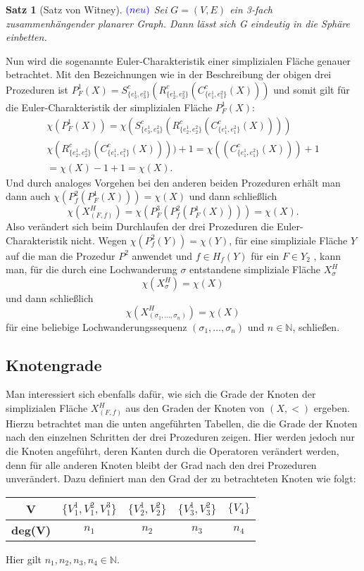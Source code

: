 \documentclass[12pt,titlepage]{article}
\newtheorem{satz}{Satz}[section]
\begin{document}
\begin{satz}[Satz von Witney]$\textcolor{blue}{(neu)}$
Sei $G=(V,E)$ ein 3-fach zusammenhängender planarer Graph. Dann lässt sich G eindeutig in die Sphäre einbetten.
\end{satz}
Nun wird die sogenannte Euler-Charakteristik einer simplizialen Fläche genauer betrachtet.
Mit den Bezeichnungen wie in der Beschreibung der obigen drei Prozeduren ist $P_F^1(X)=S^c_{\{e_3^1,e_3^2\}}(R^c_{\{e_2^1,e_2^2\}}(C^c_{\{ e_1^1,e_1^2\} }(X)))$ und somit gilt für die Euler-Charakteristik der simplizialen Fläche $P^1_F(X):$ 
\begin{gather*}
\chi (P^1_F(X))=\chi(S^c_{\{e_3^1,e_3^2\}}(R^c_{\{e_2^1,e_2^2\}}(C^c_{\{ e_1^1,e_1^2\} }(X))))\\
\chi(R^c_{\{e_2^1,e_2^2\}}(C^c_{\{ e_1^1,e_1^2\} }(X))))+1=\chi((C^c_{\{ e_1^1,e_1^2\} }(X)))+1\\
=\chi(X)-1+1=\chi(X).
\end{gather*}
Und durch analoges Vorgehen bei den anderen beiden Prozeduren erhält man dann auch $\chi(P_f^2(P_F^1(X)))=\chi(X)$ und dann schließlich 
\[
\chi(X^H_{(F,f)})=\chi(P^3_F(P_f^2(P_F^1(X))))=\chi(X).
\]
Also verändert sich beim Durchlaufen der drei Prozeduren die Euler-Charakteristik nicht. Wegen $\chi(P^2_f(Y))=\chi(Y)$, für  eine simpliziale Fläche $Y$ auf die man die Prozedur $P^2$ anwendet und $f \in H_f(Y)$ für ein $F\in Y_2$ , kann man, für die durch eine Lochwanderung $\sigma$ entstandene simpliziale Fläche $X^H_{\sigma}$
\[
\chi(X^H_{\sigma})=\chi(X)
\]
und dann schließlich
\[
\chi (X_{(\sigma_1,\ldots, \sigma_n)}^H)=\chi(X)
\]
für eine beliebige Lochwanderungssequenz $(\sigma_1,\ldots, \sigma_n)$ und $n\in \mathbb{N}$, schließen.
\subsection{Knotengrade}\label{kg}
Man interessiert sich ebenfalls dafür, wie sich die Grade der Knoten der simplizialen Fläche $X^H_{(F,f)}$ aus den Graden der Knoten von $(X,<)$ ergeben. Hierzu betrachtet man die unten angeführten Tabellen, die die Grade der Knoten nach den einzelnen Schritten der drei Prozeduren zeigen. Hier werden jedoch nur die Knoten angeführt, deren Kanten durch die Operatoren verändert werden, denn für alle anderen Knoten bleibt der Grad nach den drei Prozeduren unverändert. Dazu definiert man den Grad der zu betrachteten Knoten wie folgt:\\
\begin{center}
\begin{tabular}{|c|c|c|c|c|}
\hline
  \textbf{V} & $\{V_1^1,V_1^2,V_1^3\}$ & $\{V_2^1,V_2^2\}$& $\{V_3^1,V_3^2\}$& $\{V_4\}$\\ 
  \hline
   \textbf{deg(V)} & $n_1$ & $n_2$ & $n_3$ & $n_4$ \\  
   \hline
 \end{tabular}
 \end{center}
  Hier gilt $n_1,n_2,n_3,n_4 \in \mathbb{N}$.\\
  
\end{document}
